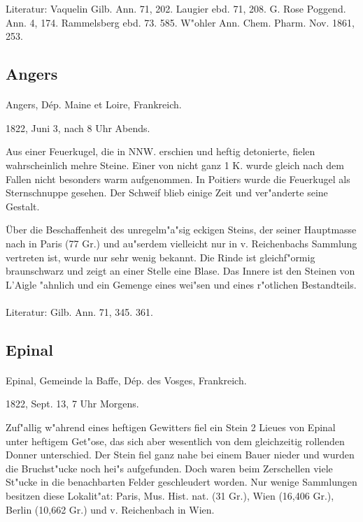 \documentclass[a4paper, 11pt, oneside]{article}
\begin{document}
\footnotesize
Literatur: Vaquelin Gilb. Ann. 71, 202. Laugier ebd. 71, 208. G. Rose Poggend. Ann. 4, 174. Rammelsberg ebd. 73. 585. W"ohler Ann. Chem. Pharm. Nov. 1861, 253.
\subsection{Angers}
\normalsize
\paragraph{}
Angers, Dép. Maine et Loire, Frankreich.

1822, Juni 3, nach 8 Uhr Abends.

Aus einer Feuerkugel, die in NNW. erschien und heftig detonierte, fielen wahrscheinlich mehre Steine. Einer von nicht ganz 1 K. wurde gleich nach dem Fallen nicht besonders warm aufgenommen. In Poitiers wurde die Feuerkugel als Sternschnuppe gesehen. Der Schweif blieb einige Zeit und ver"anderte seine Gestalt.

Über die Beschaffenheit des unregelm"a"sig eckigen Steins, der seiner Hauptmasse nach in Paris (77 Gr.) und au"serdem vielleicht nur in v. Reichenbachs Sammlung vertreten ist, wurde nur sehr wenig bekannt. Die Rinde ist gleichf"ormig braunschwarz und zeigt an einer Stelle eine Blase. Das Innere ist den Steinen von L'Aigle "ahnlich und ein Gemenge eines wei"sen und eines r"otlichen Bestandteils.
\footnotesize
\paragraph{}
Literatur: Gilb. Ann. 71, 345. 361.
\subsection{Epinal}
\normalsize
\paragraph{}
Epinal, Gemeinde la Baffe, Dép. des Vosges, Frankreich.

1822, Sept. 13, 7 Uhr Morgens.

Zuf"allig w"ahrend eines heftigen Gewitters fiel ein Stein 2 Lieues von Epinal unter heftigem Get"ose, das sich aber wesentlich von dem gleichzeitig rollenden Donner unterschied. Der Stein fiel ganz nahe bei einem Bauer nieder und wurden die Bruchst"ucke noch hei"s aufgefunden. Doch waren beim Zerschellen viele St"ucke in die benachbarten Felder geschleudert worden. Nur wenige Sammlungen besitzen diese Lokalit"at: Paris, Mus. Hist. nat. (31 Gr.), Wien (16,406 Gr.), Berlin (10,662 Gr.) und v. Reichenbach in Wien.
\end{document}
